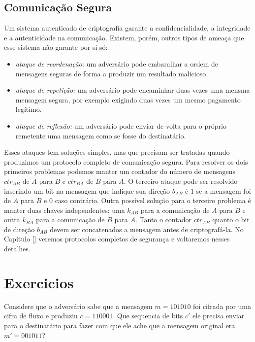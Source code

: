 \subsection{Comunicação Segura}
\label{sec:comunicacao-segura}

Um sistema autenticado de criptografia garante a confidencialidade, a integridade e a autenticidade na comunicação.
Existem, porém, outros tipos de ameaça que esse sistema não garante por si só:
\begin{itemize}
\item {\em ataque de reordenação:} um adversário pode embaralhar a ordem de mensagens seguras de forma a produzir um resultado malicioso.
\item {\em ataque de repetição:} um adversário pode encaminhar duas vezes uma mensma mensagem segura, por exemplo exigindo duas vezes um mesmo pagamento legítimo.
\item {\em ataque de reflexão:} um adversário pode enviar de volta para o próprio remetente uma mensagem como se fosse do destinatário.
\end{itemize}

Esses ataques tem soluções simples, mas que precisam ser tratadas quando produzimos um protocolo completo de comunicação segura.
Para resolver os dois primeiros problemas podemos manter um contador do número de mensagens $ctr_{AB}$ de $A$ para $B$ e $ctr_{BA}$ de $B$ para $A$.
O terceiro ataque pode ser resolvido inserindo um bit na mensagem que indique sua direção $b_{AB}$ é $1$ se a mensagem foi de $A$ para $B$ e $0$ caso contrário.
Outra possível solução para o terceiro problema é manter duas chaves independentes: uma $k_{AB}$ para a comunicação de $A$ para $B$ e outra $k_{BA}$ para a comunicação de $B$ para $A$.
Tanto o contador $ctr_{AB}$ quanto o bit de direção $b_{AB}$ devem ser concatenados a mensagem antes de criptografá-la.
No Capítulo \ref{} veremos protocolos completos de segurança e voltaremos nesses detalhes.

\section{Exercicios}
\label{sec:exercicios}


\begin{exercicio}
  Considere que o adversário sabe que a mensagem $m = 101010$ foi cifrada por uma cifra de fluxo e produziu $c = 110001$.
  Que sequencia de bits $c'$ ele precisa enviar para o destinatário para fazer com que ele ache que a mensagem original era $m' = 001011$?
\end{exercicio}


